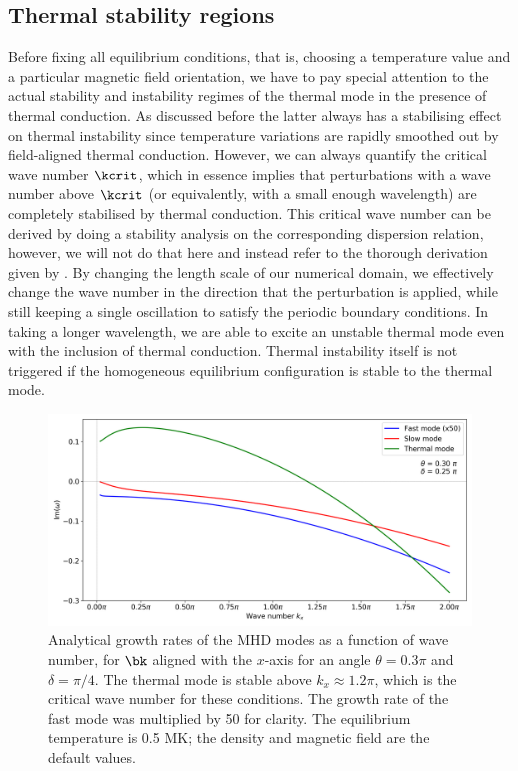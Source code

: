 \subsection{Thermal stability regions}
Before fixing all equilibrium conditions, that is, choosing a temperature value and a particular magnetic field orientation, we have to pay special attention to the actual stability and instability regimes of the thermal mode in the presence of thermal conduction. As discussed before the latter always has a stabilising effect on thermal instability since temperature variations are rapidly smoothed out by field-aligned thermal conduction. However, we can always quantify the critical wave number $\kcrit$, which in essence implies that perturbations with a wave number above $\kcrit$ (or equivalently, with a small enough wavelength) are completely stabilised by thermal conduction. This critical wave number can be derived by doing a stability analysis on the corresponding dispersion relation, however, we will not do that here and instead refer to the thorough derivation given by \citet{field1965}. By changing the length scale of our numerical domain, we effectively change the wave number in the direction that the perturbation is applied, while still keeping a single oscillation to satisfy the periodic boundary conditions. In taking a longer wavelength, we are able to excite an unstable thermal mode even with the inclusion of thermal conduction. Thermal instability itself is not triggered if the homogeneous equilibrium configuration is stable to the thermal mode.

\begin{figure}[t]
  \centering
  \includegraphics[width=\textwidth]{w_vs_kx.png}
  \caption{
    Analytical growth rates of the MHD modes as a function of wave number, for $\bk$ aligned with the $x$-axis for an angle $\theta = 0.3\pi$ and $\delta = \pi/4$. The thermal mode is stable above $k_x \approx 1.2\pi$, which is the critical wave number for these conditions. The growth rate of the fast mode was multiplied by 50 for clarity. The equilibrium temperature is 0.5 MK; the density and magnetic field are the default values.
  }
  \label{fig: w_vs_kx}
\end{figure}

